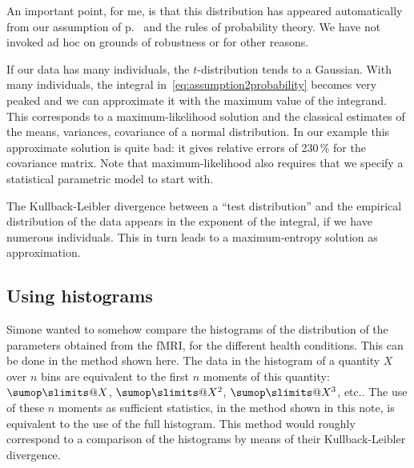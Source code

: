 \documentclass[\ifafour a4paper,12pt,\else a5paper,10pt,\fi%
onecolumn,oneside,article,%
british%
]{memoir}
\makeatletter
\newif\ifpublic
\theoremstyle{remark}
\theoremstyle{innote}
\def\sum{\DOTSI\sumop\slimits@}
\newcommand*{\amp}{\&}
\newenvironment{acknowledgements}{\section*{Thanks}\addcontentsline{toc}{section}{Thanks}}{\par}
\newcommand*\autanet{\texttt{[image: autanet.pdf]}}
\newcommand*{\pf}{\mathrm{p}}%
\renewcommand*{\|}{\mathpunct{|}}
\newcommand*{\etc}{{etc.}}
\newcommand*{\yx}{x}
\newcommand*{\yxx}{\bm{\yx}}
\newcommand*{\data}{\text{data}}
\theoremstyle{plain}
\makeatother
\begin{document}
An important point, for me, is that this distribution has appeared
automatically from our assumption of p.~\pageref{eq:assumption} and the
rules of probability theory. We have not invoked ad hoc on grounds of
robustness or for other reasons.

If our data has many individuals, the $t$-distribution tends to a Gaussian.
With many individuals, the integral in~\eqref{eq:assumption2probability}
becomes very peaked and we can approximate it with the maximum value of the
integrand. This corresponds to a maximum-likelihood solution and the
classical estimates of the means, variances, covariance of a normal
distribution. In our example this approximate solution is quite bad: it
gives relative errors of 230\,\% for the covariance matrix. Note that
maximum-likelihood also requires that we specify a statistical parametric
model to start with.

The Kullback-Leibler divergence between a \enquote{test distribution} and
the empirical distribution of the data  appears in the exponent of the
integral, if we have numerous individuals. This in turn leads to a
maximum-entropy solution as approximation.


\subsection{Using histograms}
\label{sec:histograms}

Simone wanted to somehow compare the histograms of the distribution of the
parameters obtained from the fMRI, for the different health conditions.
This can be done in the method shown here. The data in the histogram of a
quantity $X$ over $n$ bins are equivalent to the first $n$ moments of this
quantity: $\sum X$, $\sum X^2$, $\sum X^3$, \etc. The use of these $n$
moments as sufficient statistics, in the method shown in this note, is
equivalent to the use of the full histogram. This method would roughly
correspond to a comparison of the histograms by means of their
Kullback-Leibler divergence.


\ifpublic
\begin{acknowledgements}
  PGLPM thanks Mari \amp\ Miri for continuous encouragement and affection,
   Buster Keaton and Saitama for filling life with awe and
  inspiration, and  the developers and maintainers of \LaTeX, Emacs, AUC\TeX,
  Open Science Framework, biorXiv, PhilSci, Hal archives, Python, Inkscape,
  Sci-Hub for making a free and unfiltered scientific exchange possible.
\end{acknowledgements}
\fi
\end{document}
